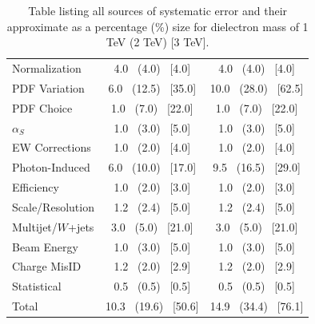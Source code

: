 \begin {table}[h]
\begin{center}
\begin{tabular}{ | l | c c | }
            \hline
            Normalization       & 4.0 ~(4.0) ~[4.0]           & 4.0 ~(4.0) ~[4.0] \\
            PDF Variation       & 6.0 ~(12.5) ~[35.0]         & 10.0 ~(28.0) ~[62.5] \\
            PDF Choice          & 1.0 ~(7.0) ~[22.0]          & 1.0 ~(7.0) ~[22.0] \\
            $\alpha_S$          & 1.0 ~(3.0) ~[5.0]           & 1.0 ~(3.0) ~[5.0] \\
            EW Corrections      & 1.0 ~(2.0) ~[4.0]           & 1.0 ~(2.0) ~[4.0] \\
            Photon-Induced      & 6.0 ~(10.0) ~[17.0]         & 9.5 ~(16.5) ~[29.0]    \\
            Efficiency          & 1.0 ~(2.0) ~[3.0]           & 1.0 ~(2.0) ~[3.0] \\
            Scale/Resolution    & 1.2 ~(2.4) ~[5.0]           & 1.2 ~(2.4) ~[5.0] \\
            Multijet/$W$+jets  & 3.0 ~(5.0) ~[21.0]          & 3.0 ~(5.0) ~[21.0] \\
            Beam Energy         & 1.0 ~(3.0) ~[5.0]           & 1.0 ~(3.0) ~[5.0] \\
            Charge MisID        & 1.2 ~(2.0) ~[2.9]           & 1.2 ~(2.0) ~[2.9] \\
            Statistical         & 0.5 ~(0.5) ~[0.5]           & 0.5 ~(0.5) ~[0.5] \\
            \hline   
            Total               & 10.3 ~(19.6) ~[50.6]        & 14.9 ~(34.4) ~[76.1] \\ 
            \hline
        \end{tabular}
        \caption{Table listing all sources of systematic error and their approximate as a percentage (\%) size for dielectron mass of 1 TeV (2 TeV) [3 TeV].}
        \label{tab:sys}
        \end{center}
    \end {table}



